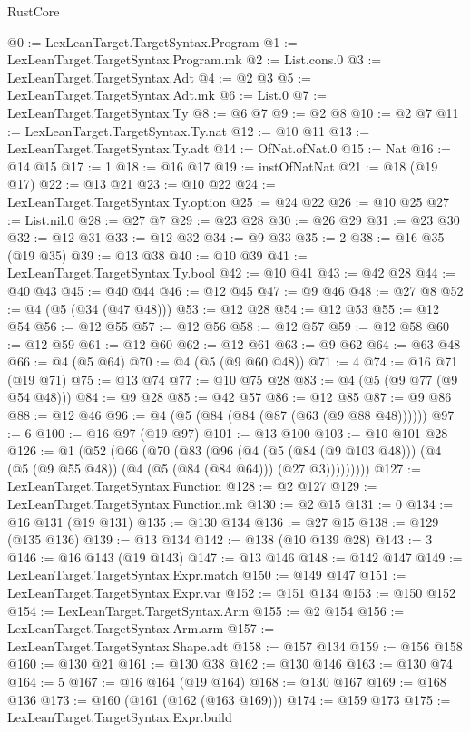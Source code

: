 \begin{lexlean}{RustCore}
\begin{coremodule}
@0 := LexLeanTarget.TargetSyntax.Program
@1 := LexLeanTarget.TargetSyntax.Program.mk
@2 := List.cons.{0}
@3 := LexLeanTarget.TargetSyntax.Adt
@4 := @2 @3
@5 := LexLeanTarget.TargetSyntax.Adt.mk
@6 := List.{0}
@7 := LexLeanTarget.TargetSyntax.Ty
@8 := @6 @7
@9 := @2 @8
@10 := @2 @7
@11 := LexLeanTarget.TargetSyntax.Ty.nat
@12 := @10 @11
@13 := LexLeanTarget.TargetSyntax.Ty.adt
@14 := OfNat.ofNat.{0}
@15 := Nat
@16 := @14 @15
@17 := 1
@18 := @16 @17
@19 := instOfNatNat
@21 := @18 (@19 @17)
@22 := @13 @21
@23 := @10 @22
@24 := LexLeanTarget.TargetSyntax.Ty.option
@25 := @24 @22
@26 := @10 @25
@27 := List.nil.{0}
@28 := @27 @7
@29 := @23 @28
@30 := @26 @29
@31 := @23 @30
@32 := @12 @31
@33 := @12 @32
@34 := @9 @33
@35 := 2
@38 := @16 @35 (@19 @35)
@39 := @13 @38
@40 := @10 @39
@41 := LexLeanTarget.TargetSyntax.Ty.bool
@42 := @10 @41
@43 := @42 @28
@44 := @40 @43
@45 := @40 @44
@46 := @12 @45
@47 := @9 @46
@48 := @27 @8
@52 := @4 (@5 (@34 (@47 @48)))
@53 := @12 @28
@54 := @12 @53
@55 := @12 @54
@56 := @12 @55
@57 := @12 @56
@58 := @12 @57
@59 := @12 @58
@60 := @12 @59
@61 := @12 @60
@62 := @12 @61
@63 := @9 @62
@64 := @63 @48
@66 := @4 (@5 @64)
@70 := @4 (@5 (@9 @60 @48))
@71 := 4
@74 := @16 @71 (@19 @71)
@75 := @13 @74
@77 := @10 @75 @28
@83 := @4 (@5 (@9 @77 (@9 @54 @48)))
@84 := @9 @28
@85 := @42 @57
@86 := @12 @85
@87 := @9 @86
@88 := @12 @46
@96 := @4 (@5 (@84 (@84 (@87 (@63 (@9 @88 @48))))))
@97 := 6
@100 := @16 @97 (@19 @97)
@101 := @13 @100
@103 := @10 @101 @28
@126 := @1
    (@52
      (@66
        (@70
          (@83
            (@96
              (@4
                (@5 (@84 (@9 @103 @48)))
                (@4 (@5 (@9 @55 @48)) (@4 (@5 (@84 (@84 @64))) (@27 @3)))))))))
@127 := LexLeanTarget.TargetSyntax.Function
@128 := @2 @127
@129 := LexLeanTarget.TargetSyntax.Function.mk
@130 := @2 @15
@131 := 0
@134 := @16 @131 (@19 @131)
@135 := @130 @134
@136 := @27 @15
@138 := @129 (@135 @136)
@139 := @13 @134
@142 := @138 (@10 @139 @28)
@143 := 3
@146 := @16 @143 (@19 @143)
@147 := @13 @146
@148 := @142 @147
@149 := LexLeanTarget.TargetSyntax.Expr.match
@150 := @149 @147
@151 := LexLeanTarget.TargetSyntax.Expr.var
@152 := @151 @134
@153 := @150 @152
@154 := LexLeanTarget.TargetSyntax.Arm
@155 := @2 @154
@156 := LexLeanTarget.TargetSyntax.Arm.arm
@157 := LexLeanTarget.TargetSyntax.Shape.adt
@158 := @157 @134
@159 := @156 @158
@160 := @130 @21
@161 := @130 @38
@162 := @130 @146
@163 := @130 @74
@164 := 5
@167 := @16 @164 (@19 @164)
@168 := @130 @167
@169 := @168 @136
@173 := @160 (@161 (@162 (@163 @169)))
@174 := @159 @173
@175 := LexLeanTarget.TargetSyntax.Expr.build

\end{coremodule}
\end{lexlean}
